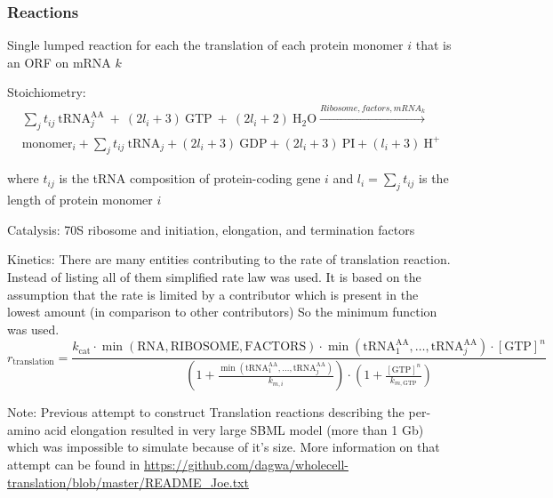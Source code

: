 \documentclass[10pt]{article}
\begin{document}
\subsubsection{Reactions}
\begin{compactitem}
\item Single lumped reaction for each the translation of each protein monomer $i$ that is an ORF on mRNA $k$
\item Stoichiometry:
\begin{multline*}
    \sum_j t_{ij}~\text{tRNA}^{\text{AA}}_j ~+ ~
(2 l_i + 3)~\text{GTP}~ + ~(2 l_i + 2)~\text{H}_2\text{O} 
    \xrightarrow{Ribosome, factors, mRNA_k} \\
    \text{monomer}_i + \sum_j t_{ij}~\text{tRNA}_j + (2 l_i + 3)~\text{GDP} + (2 l_i + 3)~\text{PI} + (l_i + 3)~\text{H}^+
\end{multline*}

    where $t_{ij}$ is the tRNA composition of protein-coding gene $i$ and $l_i = \sum_j t_{ij}$ is the length of protein monomer $i$
\item Catalysis: 70S ribosome and initiation, elongation, and termination factors
\item Kinetics: %
There are many entities contributing to the rate of translation reaction.
 Instead of listing all of them simplified rate law was used.   
It is  based on the assumption that the rate is limited by a contributor which is present in the lowest amount (in comparison to other contributors) 
So the  minimum function was used.
\[
r_{\mathrm{translation}} = \frac{k_{\mathrm{cat}} \cdot \min(\mathrm{RNA,RIBOSOME,FACTORS}) \cdot \min(\mathrm{tRNA}^{\text{AA}}_1 , \dots , \mathrm{tRNA}^{\text{AA}}_j) \cdot \mathrm{[GTP]}^n}{(1 + \frac{\min(\mathrm{tRNA}^{\text{AA}}_1 , \dots , \mathrm{tRNA}^{\text{AA}}_j)}{k_{m,i}}) \cdot (1 + \frac{\mathrm{[GTP]}^n}{k_{m,\mathrm{GTP}}})}
\]
\item Note: Previous attempt to construct Translation reactions describing the per-amino acid elongation resulted in very large SBML model (more than 1 Gb) which was impossible to simulate because of it's size. 
 More information on that attempt can be found in \url{https://github.com/dagwa/wholecell-translation/blob/master/README_Joe.txt}
\end{compactitem}
\end{document}
